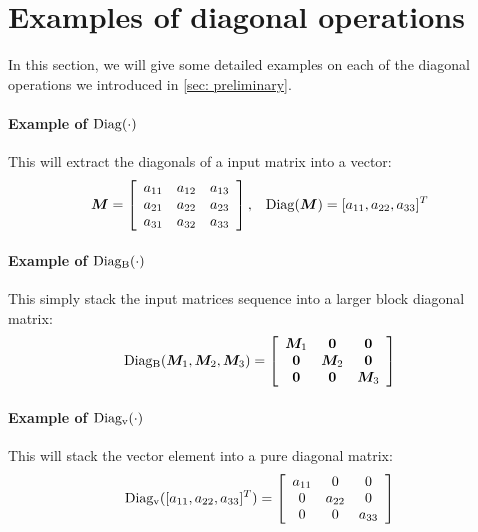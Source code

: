 \section{Examples of diagonal operations}
\label{app: example diagonal operations}
In this section, we will give some detailed examples on each of the diagonal operations we introduced in \cref{sec: preliminary}. 
\paragraph{Example of $\operatorname{Diag}(\cdot)$}
This will extract the diagonals of a input matrix into a vector:
\begin{align*}
    {\bm{M}} = \left[\begin{array}{ccc}
       a_{11}  & a_{12}&a_{13}  \\
        a_{21} & a_{22} & a_{23}\\
        a_{31}&a_{32} & a_{33}
    \end{array}\right],\;\;\; \operatorname{Diag}({\bm{M}}) = [a_{11}, a_{22}, a_{33}]^T
\end{align*}

\paragraph{Example of $\operatorname{Diag_B}(\cdot)$}
This simply stack the input matrices sequence into a larger block diagonal matrix:
\begin{align*}
    \operatorname{Diag_B}({\bm{M}}_1,{\bm{M}}_2,{\bm{M}}_3) = \left[\begin{array}{ccc}
        {\bm{M}}_1 & \bm{0} & \bm{0}  \\
        \bm{0} & {\bm{M}}_2 & \bm{0}\\
        \bm{0} & \bm{0} & {\bm{M}}_3
    \end{array}\right]
\end{align*}

\paragraph{Example of $\operatorname{Diag_v}(\cdot)$}
This will stack the vector element into a pure diagonal matrix:
\begin{align*}
    \operatorname{Diag_v}([a_{11},a_{22}, a_{33}]^T) = \left[\begin{array}{ccc}
        a_{11} & 0 & 0  \\
         0&a_{22}&0\\
         0&0&a_{33}
    \end{array}\right]
\end{align*}

